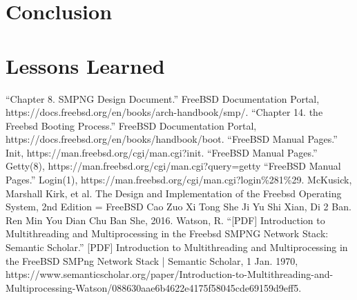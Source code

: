 \documentclass[12pt, dvipsnames, a4paper]{article}
\begin{document}
\section{Conclusion}
\lipsum[1]

\section{Lessons Learned}
\lipsum[1]

\begin{thebibliography}{00}
	 “Chapter 8. SMPNG Design Document.” FreeBSD Documentation Portal, https://docs.freebsd.org/en/books/arch-handbook/smp/.
	 “Chapter 14. the Freebsd Booting Process.” FreeBSD Documentation Portal,
	https://docs.freebsd.org/en/books/handbook/boot.
	 “FreeBSD Manual Pages.” Init, https://man.freebsd.org/cgi/man.cgi?init.
	 “FreeBSD Manual Pages.” Getty(8), https://man.freebsd.org/cgi/man.cgi?query=getty
	 “FreeBSD Manual Pages.” Login(1), https://man.freebsd.org/cgi/man.cgi?login\%281\%29.
	 McKusick, Marshall Kirk, et al. The Design and Implementation of the Freebsd Operating System, 2nd Edition = FreeBSD Cao Zuo Xi Tong She Ji Yu Shi Xian, Di 2 Ban. Ren Min You Dian Chu Ban She, 2016.
	 Watson, R. “[PDF] Introduction to Multithreading and Multiprocessing in the Freebsd SMPNG Network Stack: Semantic Scholar.” [PDF]  Introduction to Multithreading and Multiprocessing in the FreeBSD SMPng Network Stack | Semantic Scholar, 1 Jan. 1970, https://www.semanticscholar.org/paper/Introduction-to-Multithreading-and-Multiprocessing-Watson/088630aae6b4622e4175f58045cde69159d9eff5.
\end{thebibliography}
\end{document}
